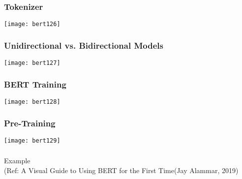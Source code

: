 \begin{frame}[fragile]\frametitle{Tokenizer}

			\begin{center}
			\texttt{[image: bert126]}
			\end{center}	

\end{frame}

\begin{frame}[fragile]\frametitle{ Unidirectional vs. Bidirectional Models}

			\begin{center}
			\texttt{[image: bert127]}
			\end{center}	

\end{frame}

\begin{frame}[fragile]\frametitle{ BERT Training}

			\begin{center}
			\texttt{[image: bert128]}
			\end{center}	


\end{frame}

\begin{frame}[fragile]\frametitle{Pre-Training}

			\begin{center}
			\texttt{[image: bert129]}
			\end{center}	


\end{frame}

\begin{frame}[fragile]\frametitle{}
\begin{center}
{\Large Example} \\
{\small (Ref: A Visual Guide to Using BERT for the First Time(Jay Alammar, 2019)}
\end{center}
\end{frame}


